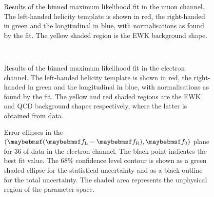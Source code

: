 \begin{figure}[h!]
\centering
{}\quad
{}
\caption[Results of the binned maximum likelihood fit - muons]{Results of the
  binned maximum likelihood fit in the muon channel. The left-handed helicity
  template is shown in red, the right-handed in green and the longitudinal in
  blue, with normalisations as found by the fit. The yellow shaded region is
  the \ac{EWK} background shape.}
\label{fig:wpol_fit_results_mu}
\end{figure}

\begin{figure}[h!]
\centering
{}\quad
{}\\
\caption[Results of the binned maximum likelihood fit - electrons]{Results of
  the binned maximum likelihood fit in the electron channel. The left-handed
  helicity template is shown in red, the right-handed in green and the
  longitudinal in blue, with normalisations as found by the fit. The yellow and
  red shaded regions are the \ac{EWK} and \ac{QCD} background shapes
  respectively, where the latter is obtained from data.}
\label{fig:wpol_fit_results_ele}
\end{figure}



\begin{figure}[h!]
\centering
{}\quad
{}
\caption[Error ellipses in the $(\fLmfR, \f0)$ plane for the electron
channel]{Error ellipses in the $(\fLmfR, \f0)$ plane for \unit{36}{\invpb} of
  data in the electron channel. The black point indicates the best fit
  value. The 68\% confidence level contour is shown as a green shaded ellipse
  for the statistical uncertainty and as a black outline for the total
  uncertainty. The shaded area represents the unphysical region of the parameter
  space.}
\label{fig:wpol_contour_ele}
\end{figure}

